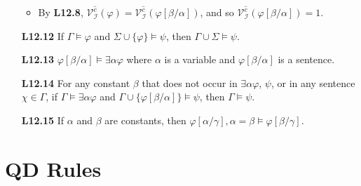 \documentclass[a4paper, 11pt]{article} %
\newcommand{\set}[1]{\lbrace#1\rbrace} %
\newcommand{\I}{\mathcal{I}}
\newcommand{\VV}[2]{\mathcal{V}_{#1}^{#2}} %
\newcommand{\va}[1]{\hat{#1}} %
\newcommand{\unisub}[2]{[#1/#2]}
\renewcommand{\models}{\vDash}
\def\metaA{\ensuremath{\varphi}}
\def\metaB{\ensuremath{\psi}}
\def\metaC{\ensuremath{\chi}}
\begin{document}
\begin{enumerate}[labelsep=.1in]
\begin{itemize}
      \item By \textbf{L12.8}, $\VV{\I}{\va{c}}(\metaA)=\VV{\I}{\va{c}}(\metaA\unisub{\beta}{\alpha})$, and so $\VV{\I}{\va{c}}(\metaA\unisub{\beta}{\alpha})=1$.
    \end{itemize}
  \item[\bf L12.12] If $\Gamma \models \metaA$ and $\Sigma \cup \set{\metaA} \models \metaB$, then $\Gamma\cup\Sigma \models \metaB$.
  \item[\bf L12.13] $\metaA\unisub{\beta}{\alpha} \models \exists\alpha\metaA$ where $\alpha$ is a variable and $\metaA\unisub{\beta}{\alpha}$ is a sentence.
  \item[\bf L12.14] For any constant $\beta$ that does not occur in $\exists\alpha\metaA$, $\metaB$, or in any sentence $\metaC\in\Gamma$, if $\Gamma \models \exists\alpha\metaA$ and $\Gamma \cup \set{\metaA\unisub{\beta}{\alpha}} \models \metaB$, then $\Gamma \models \metaB$.
  \item[\bf L12.15] If $\alpha$ and $\beta$ are constants, then $\metaA\unisub{\alpha}{\gamma}, \alpha = \beta \models \metaA\unisub{\beta}{\gamma}$.
\end{enumerate}


\section*{QD Rules}
\end{document}
